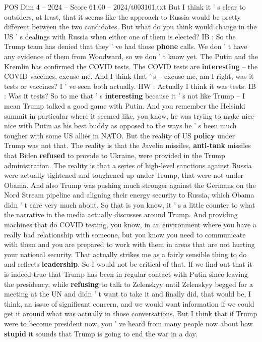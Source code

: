 \begin{textsample}{POS Dim 4 – 2024 – Score 61.00 – 2024/t003101.txt}
But I think it ' s clear to outsiders, at least, that it seems like the approach to Russia would be pretty different between the two candidates.
But what do you think would change in the US ' s dealings with Russia when either one of them is elected?
IB : So the Trump team has denied that they ' ve had those \textbf{phone} calls.
We don ' t have any evidence of them from Woodward, so we don ' t know yet.
The Putin and the Kremlin has confirmed the COVID tests.
The COVID tests are \textbf{interesting} -- the COVID vaccines, excuse me.
And I think that ' s -- excuse me, am I right, was it tests or vaccines?
I ' ve seen both actually.
HW : Actually I think it was tests.
IB : Was it tests?
So to me that ' s \textbf{interesting} because it ' s not like Trump -- I mean Trump talked a good game with Putin.
And you remember the Helsinki summit in particular where it seemed like, you know, he was trying to make nice-nice with Putin as his best buddy as opposed to the ways he ' s been much tougher with some US allies in NATO.
But the reality of US \textbf{policy} under Trump was not that.
The reality is that the Javelin missiles, \textbf{anti-tank} missiles that Biden \textbf{refused} to provide to Ukraine, were provided in the Trump administration.
The reality is that a series of high-level sanctions against Russia were actually tightened and toughened up under Trump, that were not under Obama.
And also Trump was pushing much stronger against the Germans on the Nord Stream pipeline and aligning their energy security to Russia, which Obama didn ' t care very much about.
So that is you know, it ' s a little counter to what the narrative in the media actually discusses around Trump.
And providing machines that do COVID testing, you know, in an environment where you have a really bad relationship with someone, but you know you need to communicate with them and you are prepared to work with them in areas that are not hurting your national security.
That actually strikes me as a fairly sensible thing to do and reflects \textbf{leadership}.
So I would not be critical of that.
If we find out that it is indeed true that Trump has been in regular contact with Putin since leaving the presidency, while \textbf{refusing} to talk to Zelenskyy until Zelenskyy begged for a meeting at the UN and didn ' t want to take it and finally did, that would be, I think, an issue of significant concern, and we would want information if we could get it around what was actually in those conversations.
But I think that if Trump were to become president now, you ' ve heard from many people now about how \textbf{stupid} it sounds that Trump is going to end the war in a day.

\end{textsample}
